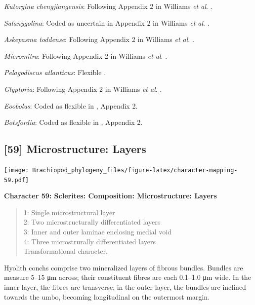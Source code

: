 \documentclass[]{book}
\theoremstyle{definition}
\theoremstyle{definition}
\theoremstyle{definition}
\theoremstyle{remark}
\begin{document}
\emph{Kutorgina chengjiangensis}: Following Appendix 2 in Williams
\emph{et al}. \citeyearpar{Williams1998Thediversity}.

\emph{Salanygolina}: Coded as uncertain in Appendix 2 in Williams
\emph{et al}. \citeyearpar{Williams1998Thediversity}.

\emph{Askepasma toddense}: Following Appendix 2 in Williams \emph{et
al}. \citeyearpar{Williams1998Thediversity}.

\emph{Micromitra}: Following Appendix 2 in Williams \emph{et al}.
\citeyearpar{Williams1998Thediversity}.

\emph{Pelagodiscus atlanticus}: Flexible
\citep{Williams1998Thediversity}.

\emph{Glyptoria}: Following Appendix 2 in Williams \emph{et al}.
\citeyearpar{Williams1998Thediversity}.

\emph{Eoobolus}: Coded as flexible in \citet{Williams1998Thediversity},
Appendix 2.

\emph{Botsfordia}: Coded as flexible in
\citet{Williams1998Thediversity}, Appendix 2.

\hypertarget{microstructure-layers}{%
\subsection*{{[}59{]} Microstructure:
Layers}\label{microstructure-layers}}

\texttt{[image: Brachiopod\_phylogeny\_files/figure-latex/character-mapping-59.pdf]}

\textbf{Character 59: Sclerites: Composition: Microstructure: Layers}

\begin{quote}
1: Single microstructural layer\\
2: Two microstructurally differentiated layers\\
3: Inner and outer laminae enclosing medial void\\
4: Three microstrurally differentiated layers\\
Transformational character.
\end{quote}

Hyolith conchs comprise two mineralized layers of fibrous bundles.
Bundles are measure 5--15 μm across; their constituent fibres are each
0.1--1.0 μm wide. In the inner layer, the fibres are transverse; in the
outer layer, the bundles are inclined towards the umbo, becoming
longitudinal on the outermost margin.
\end{document}
